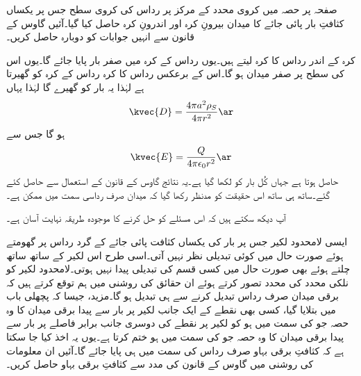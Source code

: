 صفحہ  پر حصہ  میں کروی محدد کے مرکز پر   رداس کی کروی سطح جس پر یکساں  کثافتِ بار پائی جائے کا میدان بیرونِ کرہ اور اندرونِ کرہ حاصل کیا گیا۔آئیں گاوس کے قانون سے انہیں جوابات کو دوبارہ حاصل کریں۔

کرہ کے اندر  رداس کا کرہ لیتے ہیں۔یوں  رداس کے کرہ میں صفر بار پایا جائے گا۔یوں اس کی سطح پر صفر میدان ہو گا۔اس کے برعکس  رداس کا کرہ  رداس کے کرہ کو گھیرتا ہے لہٰذا یہ  بار کو گھیرے گا لہٰذا یہاں
\begin{align*}
\kvec{D}=\frac{4\pi a^2\rho_S}{4\pi r^2 }\ar
\end{align*}
ہو گا جس سے
\begin{align*}
\kvec{E}=\frac{Q}{4\pi \epsilon_0 r^2 }\ar
\end{align*}
حاصل ہوتا ہے جہاں کُل بار کو  لکھا گیا ہے۔یہ نتائج گاوس کے قانون کے استعمال سے حاصل کئے گئے۔ساتھ ہی ساتھ اس حقیقت کو مدنظر رکھا گیا کہ میدان صرف رداسی سمت میں ممکن ہے۔

آپ دیکھ سکتے ہیں کہ اس مسئلے کو حل کرنے کا موجودہ طریقہ نہایت آسان ہے۔

ایسی لامحدود لکیر جس پر بار کی یکساں کثافت پائی جائے کے گرد رداس پر گھومتے ہوئے  صورت حال میں کوئی تبدیلی نظر نہیں آتی۔اسی طرح اس لکیر کے ساتھ ساتھ چلتے ہوئے بھی صورت حال میں کسی قسم کی تبدیلی پیدا نہیں ہوتی۔لامحدود لکیر کو نلکی محدد کی  محدد تصور کرتے  ہوئے  ان حقائق کی روشنی میں ہم توقع کرتے ہیں کہ برقی میدان صرف  رداس تبدیل کرنے سے ہی تبدیل ہو گا۔مزید، جیسا کہ پچھلی باب میں بتلایا گیا، کسی بھی نقطے کے ایک جانب لکیر پر بار سے پیدا برقی میدان کا وہ حصہ جو  کی سمت میں ہو کو لکیر پر نقطے کی دوسری جانب برابر فاصلے  پر بار سے پیدا برقی میدان کا وہ حصہ جو  کی سمت میں ہو  ختم کرتا ہے۔یوں یہ اخذ کیا جا سکتا ہے کہ کثافتِ برقی بہاو صرف رداس کی سمت میں ہی پایا جائے گا۔آئیں ان معلومات کی روشنی میں گاوس کے قانون کی مدد سے کثافتِ برقی بہاو حاصل کریں۔


